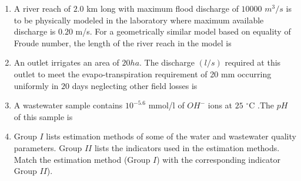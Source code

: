 \documentclass[journal]{IEEEtran}
\begin{document}
\begin{enumerate}
\item A river reach of $2.0$ km long with maximum flood discharge of $10000$ $m^{3}/s$ is to be physically modeled in the laboratory where maximum available discharge is $0.20$ m/s. For a geometrically similar model based on equality of Froude number, the length of the river reach  in the model is \hfill {}

\begin{enumerate}
\end{enumerate}

\item An outlet irrigates an area of $20  ha$. The discharge $(l/s)$ required at this outlet to meet the evapo-transpiration requirement of 20 mm occurring uniformly in $20$ days neglecting other field losses is \hfill {}

\begin{enumerate}
\end{enumerate}

\item A wastewater sample contains $10^{-5.6}$ mmol/l of $OH^{-}$ ions at $25$ $^\circ\text{C}$ .The $pH$ of this sample is \hfill {}

\begin{enumerate}
\end{enumerate}

\item Group $I$ lists estimation methods of some of the water and wastewater quality parameters. Group $II$ lists the indicators used in the estimation methods. Match the estimation method (Group $I$) with the corresponding indicator Group $II$). \hfill {}


\end{enumerate}
\end{document}
